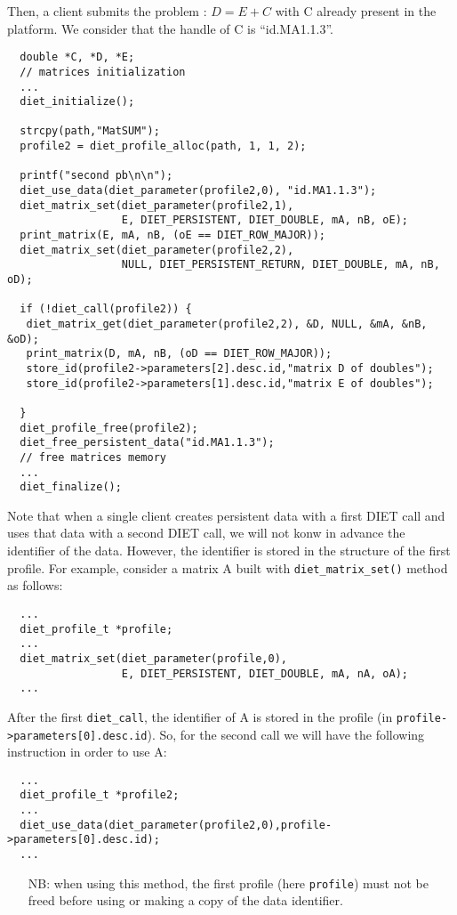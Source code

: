 Then, a client submits the problem : $D=E+C$ with C already present
in the platform. We consider that the handle of C is ``id.MA1.1.3''.

{\footnotesize
\begin{verbatim}
  double *C, *D, *E; 
  // matrices initialization
  ...
  diet_initialize();

  strcpy(path,"MatSUM");
  profile2 = diet_profile_alloc(path, 1, 1, 2);
  
  printf("second pb\n\n");
  diet_use_data(diet_parameter(profile2,0), "id.MA1.1.3");
  diet_matrix_set(diet_parameter(profile2,1),
                  E, DIET_PERSISTENT, DIET_DOUBLE, mA, nB, oE);
  print_matrix(E, mA, nB, (oE == DIET_ROW_MAJOR));
  diet_matrix_set(diet_parameter(profile2,2),
                  NULL, DIET_PERSISTENT_RETURN, DIET_DOUBLE, mA, nB, oD);
  
  if (!diet_call(profile2)) {
   diet_matrix_get(diet_parameter(profile2,2), &D, NULL, &mA, &nB, &oD);
   print_matrix(D, mA, nB, (oD == DIET_ROW_MAJOR));
   store_id(profile2->parameters[2].desc.id,"matrix D of doubles");
   store_id(profile2->parameters[1].desc.id,"matrix E of doubles");
  
  }
  diet_profile_free(profile2);
  diet_free_persistent_data("id.MA1.1.3");
  // free matrices memory
  ...
  diet_finalize();
\end{verbatim}
}  

Note that when a single client creates persistent data with a first
DIET call and uses that data with a second DIET call, we will not
konw in advance the identifier of the data.  However, the identifier 
is stored in the structure of the first profile. For example,
consider a matrix A built with
\texttt{diet\_matrix\_set()} method as follows: {\footnotesize
\begin{verbatim}
  ...
  diet_profile_t *profile;
  ...
  diet_matrix_set(diet_parameter(profile,0),
                  E, DIET_PERSISTENT, DIET_DOUBLE, mA, nA, oA);
  ...
\end{verbatim}
} After the first \texttt{diet\_call}, the identifier of A is stored in
the profile (in \texttt{profile->parameters[0].desc.id}). So, for the
second call we will have the following instruction in order to use A:
{\footnotesize
\begin{verbatim}
  ...
  diet_profile_t *profile2;
  ...
  diet_use_data(diet_parameter(profile2,0),profile->parameters[0].desc.id);
  ...
\end{verbatim}
}

\begin{itemize}
\item[NB:] when using this method, the first profile (here
\texttt{profile}) must not be freed before using or making a copy of
the data identifier.
\end{itemize}
